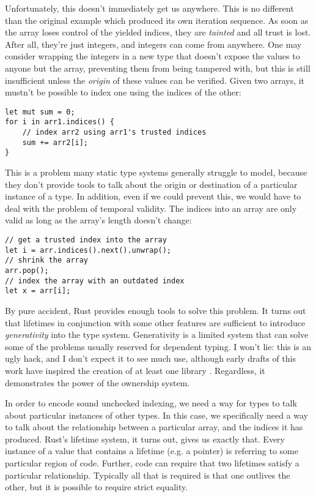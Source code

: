 Unfortunately, this doesn't immediately get us anywhere. This is no different
than the original example which produced its own iteration sequence. As soon
as the array loses control of the yielded indices, they are \emph{tainted} and all
trust is lost. After all, they're just integers, and integers can come from anywhere.
One may consider wrapping the integers in a new type that doesn't
expose the values to anyone but the array, preventing them from being
tampered with, but this is still insufficient unless the \emph{origin} of
these values can be verified. Given two arrays, it mustn't be possible to index
one using the indices of the other:

\begin{verbatim}
let mut sum = 0;
for i in arr1.indices() {
    // index arr2 using arr1's trusted indices
    sum += arr2[i];
}
\end{verbatim}

This is a problem many static type systems generally struggle to model, because
they don't provide tools to talk about the origin or destination of a particular
instance of a type. In addition, even if we could prevent this, we would have to
deal with the problem of temporal validity. The indices into an array are only
valid as long as the array's length doesn't change:

\begin{verbatim}
// get a trusted index into the array
let i = arr.indices().next().unwrap();
// shrink the array
arr.pop();
// index the array with an outdated index
let x = arr[i];
\end{verbatim}

By pure accident, Rust provides enough tools to solve
this problem. It turns out that lifetimes in conjunction with some other features
are sufficient to introduce \emph{generativity} into the type system. Generativity is
a limited system that can solve some of the problems usually reserved for
dependent typing. I won't lie: this is an ugly hack, and I don't expect it
to see much use, although early drafts of this work have inspired the creation
of at least one library \cite{bluss-indexing}. Regardless, it demonstrates the power of
the ownership system.

In order to encode sound unchecked indexing, we need a way for types to talk about
particular instances of other types. In this case, we specifically need a way
to talk about the relationship between a particular array, and the indices it has
produced. Rust's lifetime system, it turns out, gives us exactly that. Every
instance of a value that contains a lifetime (e.g. a pointer) is referring to
some particular region of code. Further, code can require that two lifetimes
satisfy a particular relationship. Typically all that is required is that
one outlives the other, but it is possible to require strict equality.

